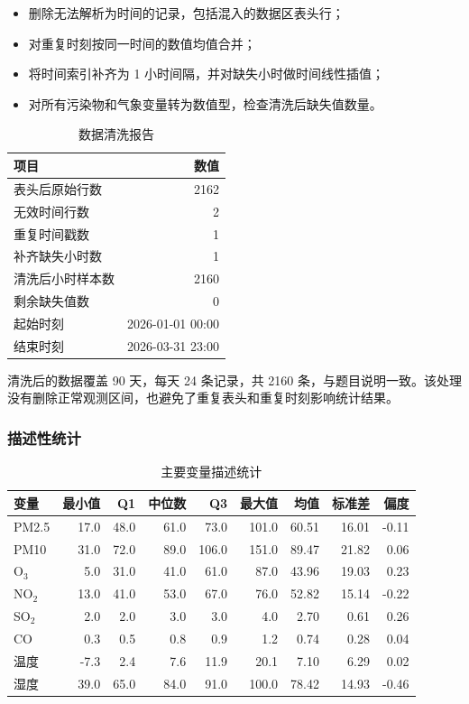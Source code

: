 \documentclass[UTF8,a4paper,12pt]{ctexart}
\begin{document}
\begin{itemize}
  \item 删除无法解析为时间的记录，包括混入的数据区表头行；
  \item 对重复时刻按同一时间的数值均值合并；
  \item 将时间索引补齐为 1 小时间隔，并对缺失小时做时间线性插值；
  \item 对所有污染物和气象变量转为数值型，检查清洗后缺失值数量。
\end{itemize}

\begin{table}[H]
\centering
\caption{数据清洗报告}
\label{tab:cleaning}
\begin{tabular}{l r}
\toprule
项目 & 数值\\
\midrule
表头后原始行数 & 2162\\
无效时间行数 & 2\\
重复时间戳数 & 1\\
补齐缺失小时数 & 1\\
清洗后小时样本数 & 2160\\
剩余缺失值数 & 0\\
起始时刻 & 2026-01-01 00:00\\
结束时刻 & 2026-03-31 23:00\\
\bottomrule
\end{tabular}
\end{table}

清洗后的数据覆盖 90 天，每天 24 条记录，共 2160 条，与题目说明一致。该处理没有删除正常观测区间，也避免了重复表头和重复时刻影响统计结果。

\subsubsection{描述性统计}

\begin{table}[H]
\centering
\caption{主要变量描述统计}
\label{tab:desc}
\small
\begin{tabular}{lrrrrrrrr}
\toprule
变量 & 最小值 & Q1 & 中位数 & Q3 & 最大值 & 均值 & 标准差 & 偏度\\
\midrule
PM2.5 & 17.0 & 48.0 & 61.0 & 73.0 & 101.0 & 60.51 & 16.01 & -0.11\\
PM10 & 31.0 & 72.0 & 89.0 & 106.0 & 151.0 & 89.47 & 21.82 & 0.06\\
O$_3$ & 5.0 & 31.0 & 41.0 & 61.0 & 87.0 & 43.96 & 19.03 & 0.23\\
NO$_2$ & 13.0 & 41.0 & 53.0 & 67.0 & 76.0 & 52.82 & 15.14 & -0.22\\
SO$_2$ & 2.0 & 2.0 & 3.0 & 3.0 & 4.0 & 2.70 & 0.61 & 0.26\\
CO & 0.3 & 0.5 & 0.8 & 0.9 & 1.2 & 0.74 & 0.28 & 0.04\\
温度 & -7.3 & 2.4 & 7.6 & 11.9 & 20.1 & 7.10 & 6.29 & 0.02\\
湿度 & 39.0 & 65.0 & 84.0 & 91.0 & 100.0 & 78.42 & 14.93 & -0.46\\
\bottomrule
\end{tabular}
\end{table}
\end{document}
